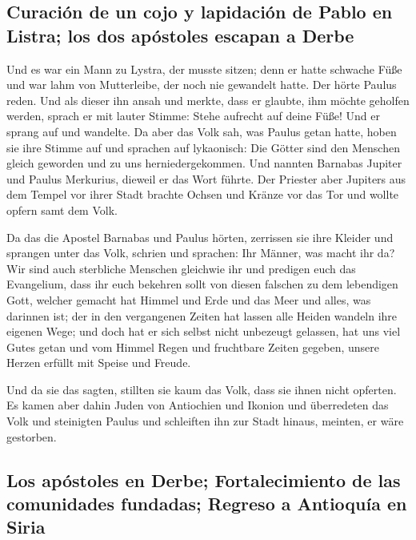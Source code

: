 \hypertarget{curaciuxf3n-de-un-cojo-y-lapidaciuxf3n-de-pablo-en-listra-los-dos-apuxf3stoles-escapan-a-derbe}{%
\subsection{Curación de un cojo y lapidación de Pablo en Listra; los dos
apóstoles escapan a
Derbe}\label{curaciuxf3n-de-un-cojo-y-lapidaciuxf3n-de-pablo-en-listra-los-dos-apuxf3stoles-escapan-a-derbe}}

 Und es war ein Mann zu Lystra, der musste sitzen; denn er
hatte schwache Füße und war lahm von Mutterleibe, der noch nie gewandelt
hatte.  Der hörte Paulus reden. Und als dieser ihn ansah
und merkte, dass er glaubte, ihm möchte geholfen werden, 
sprach er mit lauter Stimme: Stehe aufrecht auf deine Füße! Und er
sprang auf und wandelte.  Da aber das Volk sah, was
Paulus getan hatte, hoben sie ihre Stimme auf und sprachen auf
lykaonisch: Die Götter sind den Menschen gleich geworden und zu uns
herniedergekommen.  Und nannten Barnabas Jupiter und
Paulus Merkurius, dieweil er das Wort führte.  Der
Priester aber Jupiters aus dem Tempel vor ihrer Stadt brachte Ochsen und
Kränze vor das Tor und wollte opfern samt dem Volk.

 Da das die Apostel Barnabas und Paulus hörten, zerrissen
sie ihre Kleider und sprangen unter das Volk, schrien 
und sprachen: Ihr Männer, was macht ihr da? Wir sind auch sterbliche
Menschen gleichwie ihr und predigen euch das Evangelium, dass ihr euch
bekehren sollt von diesen falschen zu dem lebendigen Gott, welcher
gemacht hat Himmel und Erde und das Meer und alles, was darinnen ist;
 der in den vergangenen Zeiten hat lassen alle Heiden
wandeln ihre eigenen Wege;  und doch hat er sich selbst
nicht unbezeugt gelassen, hat uns viel Gutes getan und vom Himmel Regen
und fruchtbare Zeiten gegeben, unsere Herzen erfüllt mit Speise und
Freude.

 Und da sie das sagten, stillten sie kaum das Volk, dass
sie ihnen nicht opferten.  Es kamen aber dahin Juden von
Antiochien und Ikonion und überredeten das Volk und steinigten Paulus
und schleiften ihn zur Stadt hinaus, meinten, er wäre gestorben.

\hypertarget{los-apuxf3stoles-en-derbe-fortalecimiento-de-las-comunidades-fundadas-regreso-a-antioquuxeda-en-siria}{%
\subsection{Los apóstoles en Derbe; Fortalecimiento de las comunidades
fundadas; Regreso a Antioquía en
Siria}\label{los-apuxf3stoles-en-derbe-fortalecimiento-de-las-comunidades-fundadas-regreso-a-antioquuxeda-en-siria}}

